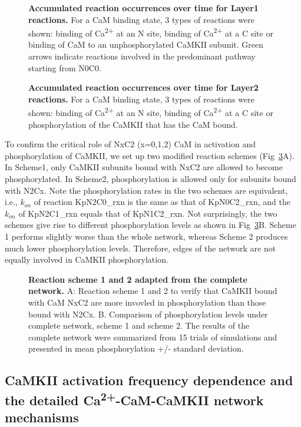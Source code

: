 \documentclass[10pt,letterpaper]{article}
\begin{document}
\begin{figure}[!h]
	\caption{{\bf Accumulated reaction occurrences over time for Layer1 reactions.}
	For a CaM binding state, 3 types of reactions were shown: binding of Ca\textsuperscript{2+} at an N site, binding of Ca\textsuperscript{2+} at a C site or binding of CaM to an unphosphorylated CaMKII subunit. Green arrows indicate reactions involved in the predominant pathway starting from N0C0.
	}
\label{fig4}
\end{figure}

\begin{figure}[!h]
	\caption{{\bf Accumulated reaction occurrences over time for Layer2 reactions.}
	For a CaM binding state, 3 types of reactions were shown: binding of Ca\textsuperscript{2+} at an N site, binding of Ca\textsuperscript{2+} at a C site or phosphorylation of the CaMKII that has the CaM bound.
	}
\label{fig5}
\end{figure}


To confirm the critical role of NxC2 (x=0,1,2) CaM in activation and phosphorylation of CaMKII, we set up two modified reaction schemes (Fig~\ref{fig6}A). In Scheme1, only CaMKII subunits bound with NxC2 are allowed to become phosphorylated. In Scheme2, phosphorylation is allowed only for subunits bound with N2Cx. Note the phosphorylation rates in the two schemes are equivalent, i.e., $k_{on}$ of reaction KpN2C0\_rxn is the same as that of KpN0C2\_rxn, and the $k_{on}$ of KpN2C1\_rxn equals that of KpN1C2\_rxn. Not surprisingly, the two schemes give rise to different phosphorylation levels as shown in Fig~\ref{fig6}B. Scheme 1 performs slightly worse than the whole network, whereas Scheme 2 produces much lower phosphorylation levels. Therefore, edges of the network are not equally involved in CaMKII phosphorylation. 

\begin{figure}[!h]
	\caption{{\bf Reaction scheme 1 and 2 adapted from the complete network.}
	A: Reaction scheme 1 and 2 to verify that CaMKII bound with CaM NxC2 are more invovled in phosphorylation than those bound with N2Cx.
	B. Comparison of phosphorylation levels under complete network, scheme 1 and scheme 2. The results of the complete network were summarized from 15 trials of simulations and presented in mean phosphorylation +/- standard deviation.
	} 
\label{fig6}
\end{figure}


\subsection*{CaMKII activation frequency dependence and the detailed Ca\textsuperscript{2+}-CaM-CaMKII network mechanisms}
\end{document}
